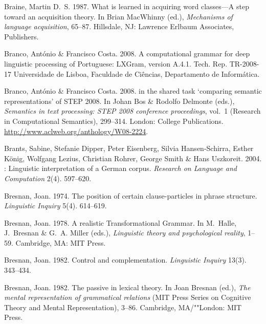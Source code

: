 \begin{thebibliography}{1420}
Braine, Martin D.~S. 1987.
\newblock What is learned in acquiring word classes---{A} step toward an
  acquisition theory.
\newblock In Brian MacWhinny (ed.), \emph{Mechanisms of language acquisition},
  65--87. Hillsdale, NJ: Lawrence Erlbaum Associates, Publishers.

Branco, Ant\'onio \& Francisco Costa. 2008{}.
\newblock A computational grammar for deep linguistic processing of
  {Portuguese: LXGram}, version {A.4.1}.
\newblock Tech. Rep. TR-2008-17 Universidade de Lisboa, Faculdade de
  Ci\^encias, Departamento de Inform\'atica.

Branco, Ant\'onio \& Francisco Costa. 2008{}.
 in the shared task `comparing semantic representations' of
  {STEP} 2008.
\newblock In Johan Bos \& Rodolfo Delmonte (eds.), \emph{Semantics in text
  processing: {STEP 2008} conference proceedings}, vol.~1  (Research in
  Computational Semantics), 299--314. London: College Publications.
\newblock \urlprefix\url{http://www.aclweb.org/anthology/W08-2224}.

Brants, Sabine, Stefanie Dipper, Peter Eisenberg, Silvia Hansen-Schirra, Esther
  K{\"o}nig, Wolfgang Lezius, Christian Rohrer, George Smith \& Hans Uszkoreit.
  2004.
: {Linguistic} interpretation of a {German} corpus.
\newblock \emph{Research on Language and Computation} 2(4). 597--620.

Bresnan, Joan. 1974.
\newblock The position of certain clause-particles in phrase structure.
\newblock \emph{Linguistic Inquiry} 5(4). 614--619.

Bresnan, Joan. 1978.
\newblock A realistic {Transformational Grammar}.
\newblock In M.~Halle, J.~Bresnan \& G.~A. Miller (eds.), \emph{Linguistic
  theory and psychological reality}, 1--59. Cambridge, MA: MIT Press.

Bresnan, Joan. 1982{}.
\newblock Control and complementation.
\newblock \emph{Linguistic Inquiry} 13(3). 343--434.

Bresnan, Joan. 1982{}.
\newblock The passive in lexical theory.
\newblock In Joan Bresnan (ed.), \emph{The mental representation of grammatical
  relations}  (MIT Press Series on Cognitive Theory and Mental Representation),
  3--86. Cambridge, MA/""London: MIT Press.


\end{thebibliography}
